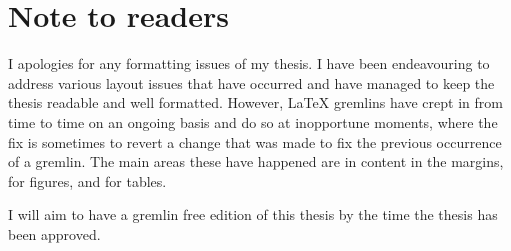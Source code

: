 \chapter*{Note to readers}

I apologies for any formatting issues of my thesis. I have been endeavouring to address various layout issues that have occurred and have managed to keep the thesis readable and well formatted. However, LaTeX gremlins have crept in from time to time on an ongoing basis and do so at inopportune moments, where the fix is sometimes to revert a change that was made to fix the previous occurrence of a gremlin. The main areas these have happened are in content in the margins, for figures, and for tables. 

I will aim to have a gremlin free edition of this thesis by the time the thesis has been approved.
